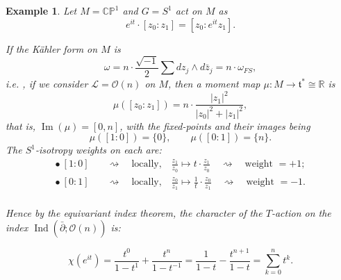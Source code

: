 \documentclass{article}
\newtheorem{example}{Example}
\newcommand{\ie}{\emph{i.e.} }
\newcommand{\ra}{\rightarrow}
\newcommand{\w}{\omega}
\newcommand{\PP}{\mathbb{P}}
\newcommand{\RR}{\mathbb{R}}
\newcommand{\CC}{\mathbb{C}}
\newcommand{\mcL}{\mathcal{L}}
\newcommand{\mcO}{\mathcal{O}}
\newcommand{\mft}{\mathfrak{t}}
\DeclareMathOperator{\Image}{Im}
\DeclareMathOperator{\Ind}{Ind}
\begin{document}
\begin{example}
	Let $M = \CC\PP^{1}$ and $G = S^{1}$ act on $M$ as
	\begin{equation*}
		e^{it} \cdot [z_{0}: z_{1}] = [z_{0} : e^{it}z_{1}].
	\end{equation*}

	If the K{\"a}hler form on $M$ is
	\begin{equation*}
		\w = n \cdot \frac{\sqrt{-1}}{2}\sum dz_{j} \wedge d\bar{z}_{j} = n \cdot \w_{FS},
	\end{equation*}
	\ie, if we consider $\mcL = \mcO(n)$ on $M$, then a moment map $\mu : M \ra \mft^{\ast} \cong \RR$ is
	\begin{equation*}
		\mu([z_{0}:z_{1}]) = n \cdot \frac{|z_{1}|^{2}}{|z_{0}|^{2} + |z_{1}|^{2} },
	\end{equation*}
	that is, $\Image(\mu) = [0,n]$, with the fixed-points and their images being
	\begin{equation*}
		\mu([1:0]) = \{0\}, \qquad \mu([0:1]) = \{n\}.
	\end{equation*}
	The $S^{1}$-isotropy weights on each are:
	\begin{equation*}
		\begin{split}
			\bullet\ [1:0] \quad &\rightsquigarrow \quad \text{locally,} \quad \frac{z_{1}}{z_{0}} \mapsto t \cdot \frac{z_{1}}{z_{0}} \quad \rightsquigarrow \quad \text{weight } = +1; \\
			\bullet\ [0:1] \quad &\rightsquigarrow \quad \text{locally,} \quad \frac{z_{0}}{z_{1}} \mapsto \frac{1}{t} \cdot \frac{z_{0}}{z_{1}} \quad \rightsquigarrow \quad \text{weight } = -1. \\
		\end{split}
	\end{equation*}

	Hence by the equivariant index theorem, the character of the $T$-action on the index $\Ind(\bar{\partial}; \mcO(n))$ is:
	
	\begin{equation*}
		\chi(e^{it}) = \frac{t^{0}}{1 - t^{1}} + \frac{t^{n}}{1 - t^{-1}} = \frac{1}{1 - t} - \frac{t^{n+1}}{1 - t} = \sum_{k = 0}^{n} t^{k}.
	\end{equation*}

\end{example}










  


\end{document}
